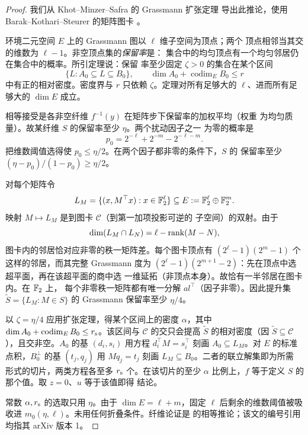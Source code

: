 \begin{proof}
我们从 Khot--Minzer--Safra 的 Grassmann 扩张定理
\cite[Theorem~1.12 in the 2018 revision]{KMS23} 导出此推论，使用
Barak--Kothari--Steurer 的矩阵图卡
\cite[Definition~3.2 and Lemmas~3.3--3.7]{BKS18}。

环境二元空间 $E$ 上的 Grassmann 图以 $\ell$ 维子空间为顶点；两个
顶点相邻当其交的维数为 $\ell-1$。非空顶点集的\emph{保留率}是：
集合中的均匀顶点有一个均匀邻居仍在集合中的概率。所引定理说：保留
率至少固定 $\zeta>0$ 的集合在某个区间
\[
 \{L:A_0\subseteq L\subseteq B_0\},
 \qquad \dim A_0+\operatorname{codim}_E B_0\le r
\]
中有正的相对密度。密度界与 $r$ 只依赖 $\zeta$。定理对所有足够大的
$\ell$、进而所有足够大的 $\dim E$ 成立。

相等接受是各非空纤维 $f^{-1}(y)$ 在矩阵步下保留率的加权平均（权重
为均匀质量）。故某纤维 $S$ 的保留率至少 $\eta$。两个扰动因子之一
为零的概率是
\[
 p_0=2^{-\ell}+2^{-m}-2^{-\ell-m}.
\]
把维数阈值选得使 $p_0\le\eta/2$。在两个因子都非零的条件下，$S$ 的
保留率至少 $(\eta-p_0)/(1-p_0)\ge\eta/2$。

对每个矩阵令
\[
 L_M=\{(x,M^\top x):x\in\mathbb F_2^\ell\}
 \subseteq E:=\mathbb F_2^\ell\oplus\mathbb F_2^m.
\]
映射 $M\mapsto L_M$ 是到图卡 $\mathcal C$（到第一加项投影可逆的
子空间）的双射。由于
\[
 \dim(L_M\cap L_N)=\ell-\operatorname{rank}(M-N),
\]
图卡内的邻居恰对应非零的秩一矩阵差。每个图卡顶点有
$(2^\ell-1)(2^m-1)$ 个这样的邻居，而其完整 Grassmann 度为
$(2^\ell-1)(2^{m+1}-2)$：先在顶点中选超平面，再在该超平面的商中选
一维延拓（非顶点本身）。故恰有一半邻居在图卡内。在 $\mathbb F_2$ 上，
每个非零秩一矩阵都有唯一分解 $a l^\top$（因子非零）。因此提升集
$\widetilde S=\{L_M:M\in S\}$ 的 Grassmann 保留率至少 $\eta/4$。

以 $\zeta=\eta/4$ 应用扩张定理，得某个区间上的密度 $\alpha$，其中
$\dim A_0+\operatorname{codim}_E B_0\le r_{\rm s}$。该区间与
$\mathcal C$ 的交只会提高 $\widetilde S$ 的相对密度（因
$\widetilde S\subseteq\mathcal C$），且交非空。$A_0$ 的基
$(d_i,s_i)$ 用方程 $d_i^\top M=s_i^\top$ 刻画
$A_0\subseteq L_M$。对 $E$ 的标准点积，$B_0^\perp$ 的基 $(t_j,q_j)$
用 $Mq_j=t_j$ 刻画 $L_M\subseteq B_0$。二者的联立解集即为所需
形式的切片，两类方程各至多 $r_{\rm s}$ 个。在该切片的至少 $\alpha$
比例上，$f$ 等于定义 $S$ 的那个值。取 $z=0$、$u$ 等于该值即得
结论。

常数 $\alpha,r_{\rm s}$ 的选取只用 $\eta$。由于
$\dim E=\ell+m$，固定 $\ell$ 后剩余的维数阈值被吸收进
$m_0(\eta,\ell)$。未用任何折叠条件。纤维论证是
\cite[Lemma~2.3]{BKS18} 的相等推论；该文的编号引用均指其 arXiv
版本 1。
\end{proof}

